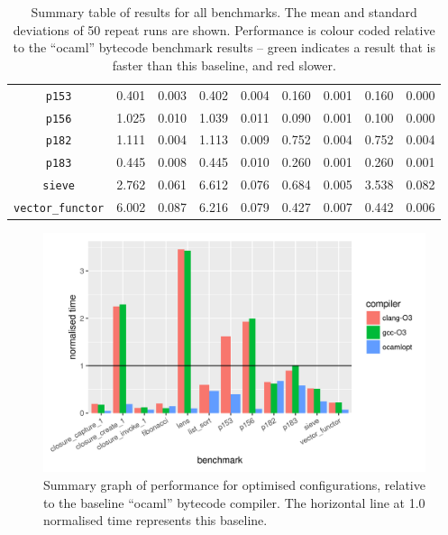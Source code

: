 \documentclass[12pt,a4paper,twoside,openright]{report}
\begin{document}
\begin{table}[h]
\begin{tabular}{| c | c c | c c | c c | c c |}
\lstinline!p153!              & \cellcolor[hsb]{0.3,0.000,1}0.401 & 0.003 & \cellcolor[hsb]{0.0,0.001,1}0.402 & 0.004 & \cellcolor[hsb]{0.3,0.601,1}0.160 & 0.001 & \cellcolor[hsb]{0.3,0.601,1}0.160 & 0.000 \\
\lstinline!p156!              & \cellcolor[hsb]{0.3,0.000,1}1.025 & 0.010 & \cellcolor[hsb]{0.0,0.007,1}1.039 & 0.011 & \cellcolor[hsb]{0.3,0.912,1}0.090 & 0.001 & \cellcolor[hsb]{0.3,0.902,1}0.100 & 0.000 \\
\lstinline!p182!              & \cellcolor[hsb]{0.3,0.000,1}1.111 & 0.004 & \cellcolor[hsb]{0.0,0.000,1}1.113 & 0.009 & \cellcolor[hsb]{0.3,0.323,1}0.752 & 0.004 & \cellcolor[hsb]{0.3,0.323,1}0.752 & 0.004 \\
\lstinline!p183!              & \cellcolor[hsb]{0.3,0.000,1}0.445 & 0.008 & \cellcolor[hsb]{0.3,0.000,1}0.445 & 0.010 & \cellcolor[hsb]{0.3,0.416,1}0.260 & 0.001 & \cellcolor[hsb]{0.3,0.416,1}0.260 & 0.001 \\
\lstinline!sieve!             & \cellcolor[hsb]{0.3,0.000,1}2.762 & 0.061 & \cellcolor[hsb]{0.0,0.697,1}6.612 & 0.076 & \cellcolor[hsb]{0.3,0.752,1}0.684 & 0.005 & \cellcolor[hsb]{0.0,0.141,1}3.538 & 0.082 \\
\lstinline!vector_functor!    & \cellcolor[hsb]{0.3,0.000,1}6.002 & 0.087 & \cellcolor[hsb]{0.0,0.018,1}6.216 & 0.079 & \cellcolor[hsb]{0.3,0.929,1}0.427 & 0.007 & \cellcolor[hsb]{0.3,0.926,1}0.442 & 0.006 \\
\hline
\end{tabular}

\caption{Summary table of results for all benchmarks. The mean and standard deviations of 50 repeat runs are shown. Performance is colour coded relative to the ``ocaml'' bytecode benchmark results -- green indicates a result that is faster than this baseline, and red slower.}\label{benchmark-table}
\end{table}

\begin{figure}
\centering
  \includegraphics[width=16cm]{resultsummary-b477d4580}

\caption{Summary graph of performance for optimised configurations, relative to
the baseline ``ocaml'' bytecode compiler. The horizontal line at 1.0 normalised
time represents this baseline.}\label{graph-summary}
\end{figure}
\end{document}
